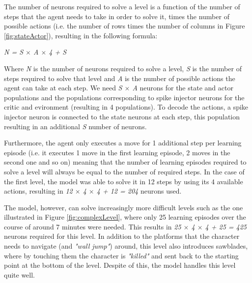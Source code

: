\documentclass[10pt]{article}
\begin{document}
    The number of neurons required to solve a level is a function of the number of steps that the agent needs to take in order to solve it, times the number of possible actions (i.e. the number of rows times the number of columns in Figure \ref{fig:stateActor}), resulting in the following formula:

    \begin{center}
        \textit{N = S $\times$ A $\times$ 4 + S}
    \end{center}

    Where \textit{N} is the number of neurons required to solve a level, \textit{S} is the number of steps required to solve that level and \textit{A} is the number of possible actions the agent can take at each step. We need \textit{S $\times$ A} neurons for the state and actor populations and the populations corresponding to spike injector neurons for the critic and evironment (resulting in 4 populations). To decode the actions, a spike injector neuron is connected to the state neurons at each step, this population resulting in an additional \textit{S} number of neurons.

    Furthermore, the agent only executes a move for 1 additional step per learning episode (i.e. it executes 1 move in the first learning episode, 2 moves in the second one and so on) meaning that the number of learning episodes required to solve a level will always be equal to the number of required steps. In the case of the first level, the model was able to solve it in 12 steps by using its 4 available actions, resulting in \textit{12 $\times$ 4 $\times$ 4 + 12 = 204} neurons used.

    The model, however, can solve increasingly more difficult levels such as the one illustrated in Figure \ref{fig:complexLevel}, where only 25 learning episodes over the course of around 7 minutes were needed. This results in \textit{25 $\times$ 4 $\times$ 4 + 25 = 425} neurons required for this level. In addition to the platforms that the character needs to navigate (and \textit{"wall jump"}) around, this level also introduces sawblades, where by touching them the character is \textit{"killed"} and sent back to the starting point at the bottom of the level. Despite of this, the model handles this level quite well.
\end{document}
